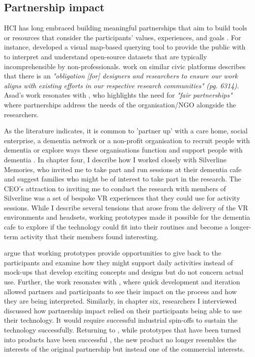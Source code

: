 \subsection{Partnership impact}
HCI has long embraced building meaningful partnerships that aim to build tools or resources that consider the participants' values, experiences, and goals \citep{vines_configuring_2013}. For instance, \cite{puussaar_making_2018} developed a visual map-based querying tool to provide the public with to interpret and understand open-source datasets that are typically incomprehensible by non-professionals. \cite{asad_tap_2017} work on similar civic platforms describes that there is an \textit{"obligation [for] designers and researchers to ensure our work aligns with existing efforts in our respective research communities" (pg. 6314)}. Asad's work resonates with \cite{gitau2009fair}, who highlights the need for \textit{"fair partnerships"} where partnerships address the needs of the organisation/NGO alongside the researchers.

As the literature indicates, it is common to 'partner up' with a care home, social enterprise, a dementia network or a non-profit organisation to recruit people with dementia or explore ways these organisations function and support people with dementia \citep{bartlett2019strategies}. In chapter four, I describe how I worked closely with Silverline Memories, who invited me to take part and run sessions at their dementia cafe and suggest families who might be of interest to take part in the research. The CEO's attraction to inviting me to conduct the research with members of Silverline was a set of bespoke VR experiences that they could use for activity sessions. While I describe several tensions that arose from the delivery of the VR environments and headsets, working prototypes made it possible for the dementia cafe to explore if the technology could fit into their routines and become a longer-term activity that their members found interesting. 

\cite{bodker2018participatory} argue that working prototypes provide opportunities to give back to the participants and examine how they might support daily activities instead of mock-ups that develop exciting concepts and designs but do not concern actual use. Further, the work resonates with \cite{lindsay_empathy_2012}, where quick development and iteration allowed partners and participants to see their impact on the process and how they are being interpreted. Similarly, in chapter six, researchers I interviewed discussed how partnership impact relied on their participants being able to use their technology. It would require successful industrial spin-offs to sustain the technology successfully. Returning to \cite{bodker2018participatory}, while prototypes that have been turned into products have been successful \citep{chilana2015user}, the new product no longer resembles the interests of the original partnership but instead one of the commercial interests. 

